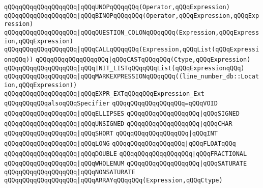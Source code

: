 \verb|qQQqqQQqqQQqqQQqqQQq|\verb#|qQQqUNOPqQQqqQQq(Operator,qQQqExpression)#\newline
\verb|qQQqqQQqqQQqqQQqqQQq|\verb#|qQQqBINOPqQQqqQQq(Operator,qQQqExpression,qQQqExpression)#\newline
\verb|qQQqqQQqqQQqqQQqqQQq|\verb#|qQQqQUESTION_COLONqQQqqQQq(Expression,qQQqExpression,qQQqExpression)#\newline
\verb|qQQqqQQqqQQqqQQqqQQq|\verb#|qQQqCALLqQQqqQQq(Expression,qQQqList(qQQqExpressionqQQq))#\newline
\verb|qQQqqQQqqQQqqQQqqQQq|\verb#|qQQqCASTqQQqqQQq(Ctype,qQQqExpression)#\newline
\verb|qQQqqQQqqQQqqQQqqQQq|\verb#|qQQqINIT_LISTqQQqqQQqList(qQQqExpressionqQQq)#\newline
\verb|qQQqqQQqqQQqqQQqqQQq|\verb#|qQQqMARKEXPRESSIONqQQqqQQq((line_number_db::Location,qQQqExpression))#\newline
\verb|qQQqqQQqqQQqqQQqqQQq|\verb#|qQQqEXPR_EXTqQQqqQQqExpression_Ext#\newline
\newline
\verb|qQQqqQQqqQQqalsoqQQqSpecifier|\newline
\verb|qQQqqQQqqQQqqQQqqQQq=qQQqVOID|\newline
\verb|qQQqqQQqqQQqqQQqqQQq|\verb#|qQQqELLIPSES#\newline
\verb|qQQqqQQqqQQqqQQqqQQq|\verb#|qQQqSIGNED#\newline
\verb|qQQqqQQqqQQqqQQqqQQq|\verb#|qQQqUNSIGNED#\newline
\verb|qQQqqQQqqQQqqQQqqQQq|\verb#|qQQqCHAR#\newline
\verb|qQQqqQQqqQQqqQQqqQQq|\verb#|qQQqSHORT#\newline
\verb|qQQqqQQqqQQqqQQqqQQq|\verb#|qQQqINT#\newline
\verb|qQQqqQQqqQQqqQQqqQQq|\verb#|qQQqLONG#\newline
\verb|qQQqqQQqqQQqqQQqqQQq|\verb#|qQQqFLOATqQQq#\newline
\verb|qQQqqQQqqQQqqQQqqQQq|\verb#|qQQqDOUBLE#\newline
\verb|qQQqqQQqqQQqqQQqqQQq|\verb#|qQQqFRACTIONAL#\newline
\verb|qQQqqQQqqQQqqQQqqQQq|\verb#|qQQqWHOLENUM#\newline
\verb|qQQqqQQqqQQqqQQqqQQq|\verb#|qQQqSATURATE#\newline
\verb|qQQqqQQqqQQqqQQqqQQq|\verb#|qQQqNONSATURATE#\newline
\verb|qQQqqQQqqQQqqQQqqQQq|\verb#|qQQqARRAYqQQqqQQq(Expression,qQQqCtype)#\newline
